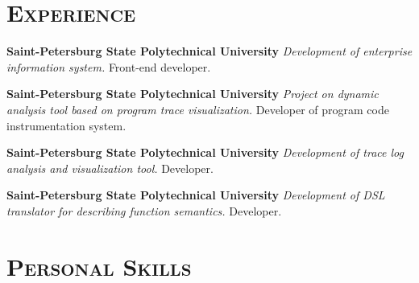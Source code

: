 \documentclass[12pt,a4paper]{moderncv}
\begin{document}
\section{\textsc{Experience}}
%
%

{\textbf{Saint-Petersburg State Polytechnical University}\newline
 \textit{Development of enterprise information system.}\newline
         Front-end developer.}

{\textbf{Saint-Petersburg State Polytechnical University}\newline
 \textit{Project on dynamic analysis tool based on program trace visualization.}
 \newline Developer of program code instrumentation system.}

{\textbf{Saint-Petersburg State Polytechnical University}\newline
 \textit{Development of trace log analysis and visualization tool.}
 \newline Developer.}

{\textbf{Saint-Petersburg State Polytechnical University}\newline
 \textit{Development of DSL translator for describing function semantics.}
 \newline Developer.}


\section{\textsc{Personal Skills}}
%
%
%
%
%

\end{document}
